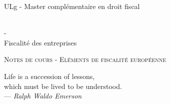 \documentclass{book}
\begin{document}
\sffamily
\newcommand{\RPoint}{\protect\texttt{[image: point.png]}}
\newcommand{\RSave}{\protect\texttt{[image: Save.png]}}
\renewcommand\labelitemii{\ding{220}}
\begin{titlepage}

\begin{center}
\begin{Large}ULg - Master complémentaire en droit fiscal\end{Large}\\
\vspace{0.5cm}- \\
\vspace{0.5cm}
Fiscalité des entreprises

\end{center}
\vspace{6cm}

\LARGE
\begin{center}
\textsc{Notes de cours - Eléments de fiscalité européenne}\\
\end{center}

\vspace{10.0cm}

\normalsize
{}

\end{titlepage}

\newpage

\thispagestyle{empty}
\setcounter{page}{0}
\null

\newpage
\thispagestyle{empty}
\setcounter{page}{0}
\vspace{20cm}

\vfill
\begin{flushright}
Life is a succession of lessons, \\
which must be lived to be understood. \\ 
--- \textit{Ralph Waldo Emerson}
\end{flushright}
\vfill
\newpage

\renewcommand{\chaptermark}[1]{\markboth{#1}{}}
\renewcommand{\sectionmark}[1]{\markright{\thesection\ #1}}
\fancyhf{} \fancyhead[LE,RO]{\bfseries\thepage}
\fancyhead[LO]{\bfseries\rightmark}
\fancyhead[RE]{\bfseries\leftmark}
\renewcommand{\headrulewidth}{0.5pt}
\addtolength{\headheight}{0.5pt}
\renewcommand{\footrulewidth}{0pt}
\fancypagestyle{plain}{ \fancyhead{}
\renewcommand{\headrulewidth}{0pt}}
\end{document}
